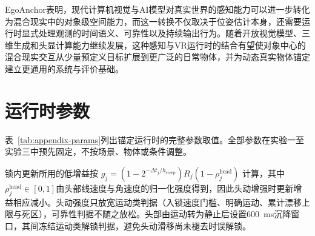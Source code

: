 \documentclass[review]{vgtc}
\begin{document}
EgoAnchor表明，现代计算机视觉与AI模型对真实世界的感知能力可以进一步转化为混合现实中的对象级空间能力，而这一转换不仅取决于位姿估计本身，还需要运行时显式处理观测的时间语义、可靠性以及持续输出行为。随着开放视觉模型、三维生成和头显计算能力继续发展，这种感知与VR运行时的结合有望使对象中心的混合现实交互从少量预定义目标扩展到更广泛的日常物体，并为动态真实物体锚定建立更通用的系统与评价基础。

\raggedbottom




\clearpage
\appendix

\section{运行时参数}\label{sec:appendix}

表~\ref{tab:appendix-params}列出锚定运行时的完整参数取值。全部参数在实验一至实验三中预先固定，不按场景、物体或条件调整。

锁内更新所用的低增益按
$g_j = (1 - 2^{-\Delta t_j / h_{\mathrm{creep}}}) R_j
(1 - \rho_j^{\mathrm{head}})$
计算，其中$\rho_j^{\mathrm{head}} \in [0,1]$由头部线速度与角速度的归一化强度得到，因此头动增强时更新增益相应减小。头动强度只放宽运动类判据（入锁速度门槛、明确运动、累计漂移上限与死区），可靠性判据不随之放松。头部由运动转为静止后设置600~ms沉降窗口，其间冻结运动类解锁判据，避免头动滑移尚未褪去时误解锁。
\end{document}
